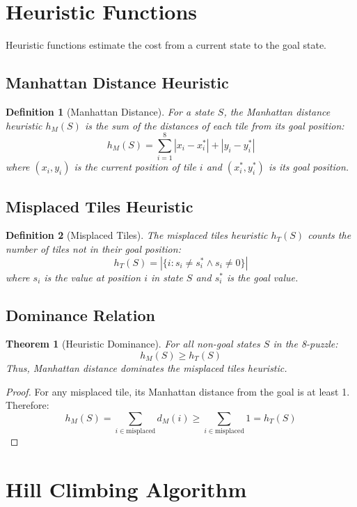 \documentclass[12pt,a4paper]{article}
\newtheorem{definition}{Definition}
\newtheorem{theorem}{Theorem}
\begin{document}
\section{Heuristic Functions}

Heuristic functions estimate the cost from a current state to the goal state.

\subsection{Manhattan Distance Heuristic}

\begin{definition}[Manhattan Distance]
For a state $S$, the Manhattan distance heuristic $h_M(S)$ is the sum of the distances of each tile from its goal position:
\[
h_M(S) = \sum_{i=1}^{8} |x_i - x_i^*| + |y_i - y_i^*|
\]
where $(x_i, y_i)$ is the current position of tile $i$ and $(x_i^*, y_i^*)$ is its goal position.
\end{definition}

\subsection{Misplaced Tiles Heuristic}

\begin{definition}[Misplaced Tiles]
The misplaced tiles heuristic $h_T(S)$ counts the number of tiles not in their goal position:
\[
h_T(S) = |\{i : s_i \neq s_i^* \land s_i \neq 0\}|
\]
where $s_i$ is the value at position $i$ in state $S$ and $s_i^*$ is the goal value.
\end{definition}

\subsection{Dominance Relation}

\begin{theorem}[Heuristic Dominance]
For all non-goal states $S$ in the 8-puzzle:
\[
h_M(S) \geq h_T(S)
\]
Thus, Manhattan distance dominates the misplaced tiles heuristic.
\end{theorem}

\begin{proof}
For any misplaced tile, its Manhattan distance from the goal is at least 1. Therefore:
\[
h_M(S) = \sum_{i \in \text{misplaced}} d_M(i) \geq \sum_{i \in \text{misplaced}} 1 = h_T(S)
\]
\end{proof}

\section{Hill Climbing Algorithm}
\end{document}
